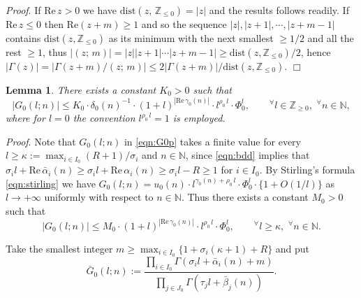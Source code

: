 \documentclass[a4paper,12pt]{article}
\theoremstyle{plain}
\newtheorem{lemma}[theorem]{Lemma}
\def\rRe{\mathrm{Re}}
\def\N{\mathbb{N}}
\def\Z{\mathbb{Z}}
\def\vG{\varGamma}
\begin{document}
{\it Proof}. If $\rRe \, z > 0$ we have $\mathrm{dist}(z, \, \Z_{\le 0}) = |z|$ 
and the results follows readily.  
If $\rRe \, z \le 0$ then $\rRe (z+m) \ge 1$ and so the sequence 
$|z|, |z+1|, \cdots, |z+m-1|$ contains $\mathrm{dist}(z, \Z_{\le 0})$ as its 
minimum with the next smallest $\ge 1/2$ and all the rest $\ge 1$, 
thus $|(z; \, m)| = |z||z+1|\cdots |z+m-1| \ge \mathrm{dist}(z, \Z_{\le 0})/2$, 
hence $|\vG(z)| = |\vG(z+m)/(z; \, m)| \le 2|\vG(z+m)|/\mathrm{dist}(z, \Z_{\le 0})$.    
\hfill $\Box$
\begin{lemma} \label{lem:G0}
There exists a constant $K_0 > 0$ such that   
\begin{equation} \label{eqn:G0-asymp} 
|G_0(l; n)| \le  K_0 \cdot \delta_0(n)^{-1} \cdot (1+ l)^{|\rRe \, \gamma_0(n)|} \cdot 
l^{\rho_0 \, l} \cdot \Phi_0^{l}, \qquad 
{}^{\forall} l \in \Z_{\ge 0}, \,\, {}^{\forall} n \in \N,           
\end{equation}
where for $l = 0$ the convention $l^{\rho_0 \, l} = 1$ is employed.     
\end{lemma}
{\it Proof}. 
Note that $G_0(l; n)$ in \eqref{eqn:G0p} takes a finite value for every  
$l \ge \kappa := \max_{i \in I_0} (R+1)/\sigma_i$ and $n \in \N$,  
since \eqref{eqn:bdd} implies that $\sigma_i l + \rRe \, \bar{\alpha}_i(n) 
\ge \sigma_i l + \rRe \, \alpha_i(n) \ge \sigma_i l - R \ge 1$ for $i \in I_0$.   
By Stirling's formula \eqref{eqn:stirling} we have  
$G_0(l; n) = u_0(n) \cdot l^{\gamma_0(n) + \rho_0 \, l} 
\cdot \Phi_0^{l} \cdot \{1+ O(1/l) \}$ as $l \to +\infty$  
uniformly with respect to $n \in \N$. 
Thus there exists a constant $M_0 > 0$ such that 
\[ 
|G_0(l; n)| \le  M_0 \cdot 
(1+ l)^{| \rRe \, \gamma_0(n) |} \cdot l^{\rho_0 \, l} \cdot \Phi_0^{l},  
\qquad {}^{\forall} l \ge \kappa, \,\, {}^{\forall} n \in \N.       
\]
\par
Take the smallest integer $m \ge \max_{i \in I_0} \{ 1 + \sigma_i (\kappa +1) + R \}$ 
and put 
\[
\bar{G}_0(l; n) := 
\dfrac{\prod_{i \in I_0} \vG(\sigma_i l + \bar{\alpha}_i(n) + m)}{ \prod_{j \in J_0} 
\vG(\tau_j l + \bar{\beta}_j(n)) }.  
\] 
\end{document}
